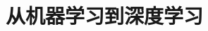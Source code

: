 \documentclass[lang=cn,scheme=chinese,12pt]{elegantbook}
\begin{document}
\chapter{从机器学习到深度学习}

\end{document}
